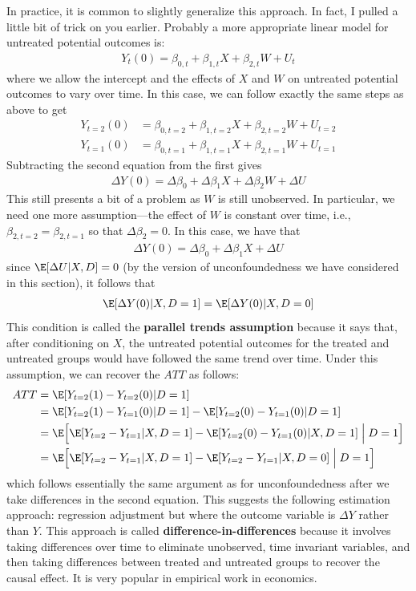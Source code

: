 \documentclass[
  letterpaper,
  DIV=11,
  numbers=noendperiod]{scrreprt}
\begin{document}
In practice, it is common to slightly generalize this approach. In fact,
I pulled a little bit of trick on you earlier. Probably a more
appropriate linear model for untreated potential outcomes is:
\begin{align*}
  Y_t(0) = \beta_{0,t} + \beta_{1,t} X + \beta_{2,t} W + U_t
\end{align*} where we allow the intercept and the effects of \(X\) and
\(W\) on untreated potential outcomes to vary over time. In this case,
we can follow exactly the same steps as above to get \begin{align*}
  Y_{t=2}(0) &= \beta_{0,t=2} + \beta_{1,t=2} X + \beta_{2,t=2} W + U_{t=2} \\
  Y_{t=1}(0) &= \beta_{0,t=1} + \beta_{1,t=1} X + \beta_{2,t=1} W + U_{t=1}
\end{align*} Subtracting the second equation from the first gives
\begin{align*}
  \Delta Y(0) = \Delta \beta_0 + \Delta \beta_1 X + \Delta \beta_2 W + \Delta U
\end{align*} This still presents a bit of a problem as \(W\) is still
unobserved. In particular, we need one more assumption---the effect of
\(W\) is constant over time, i.e., \(\beta_{2,t=2} = \beta_{2,t=1}\) so
that \(\Delta \beta_2 = 0\). In this case, we have that \begin{align*}
  \Delta Y(0) = \Delta \beta_0 + \Delta \beta_1 X + \Delta U
\end{align*} since \(\E[\Delta U | X, D] = 0\) (by the version of
unconfoundedness we have considered in this section), it follows that
\begin{align*}
  \E[\Delta Y(0) | X, D=1] = \E[\Delta Y(0) | X, D=0]
\end{align*} This condition is called the \textbf{parallel trends
assumption} because it says that, after conditioning on \(X\), the
untreated potential outcomes for the treated and untreated groups would
have followed the same trend over time. Under this assumption, we can
recover the \(ATT\) as follows: \begin{align*}
  ATT &= \E[Y_{t=2}(1) - Y_{t=2}(0) | D=1] \\
      &= \E[Y_{t=2}(1) - Y_{t=1}(0) | D=1] - \E[Y_{t=2}(0) - Y_{t=1}(0) | D=1] \\
      &= \E\Big[ \E[Y_{t=2} - Y_{t=1} | X, D=1] - \E[Y_{t=2}(0) - Y_{t=1}(0) | X, D=1] \Bigm| D=1 \Big] \\
      &= \E\Big[ \E[Y_{t=2} - Y_{t=1} | X, D=1] - \E[Y_{t=2} - Y_{t=1} | X, D=0] \Bigm| D=1 \Big] \\
\end{align*} which follows essentially the same argument as for
unconfoundedness after we take differences in the second equation. This
suggests the following estimation approach: regression adjustment but
where the outcome variable is \(\Delta Y\) rather than \(Y\). This
approach is called \textbf{difference-in-differences} because it
involves taking differences over time to eliminate unobserved, time
invariant variables, and then taking differences between treated and
untreated groups to recover the causal effect. It is very popular in
empirical work in economics.
\end{document}
